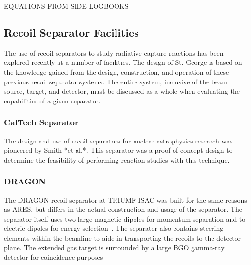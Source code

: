 EQUATIONS FROM SIDE LOGBOOKS


\subsection{Recoil Separator Facilities}

The use of recoil separators to study radiative capture reactions has been
explored recently at a number of facilities. The design of St. George is based
on the knowledge gained from the design, construction, and operation of these
previous recoil separator systems. The entire system, inclusive of the beam
source, target, and detector, must be discussed as a whole when evaluating the
capabilities of a given separator.

\subsubsection{CalTech Separator}

The design and use of recoil separators for nuclear astrophysics research was
pioneered by Smith *et al.*. This separator was a proof-of-concept design to
determine the feasibility of performing reaction studies with this technique.

\subsubsection{DRAGON}
The DRAGON recoil separator at TRIUMF-ISAC was built for the same reasons as ARES,
but differs in the actual construction and usage of the separator.
The separator
itself uses two large magnetic dipoles for momentum separation and to electric
dipoles for energy selection~\cite{Engel2005}. The separator also contains
steering elements within the beamline to aide in transporting the recoils to
the detector plane. The extended gas target is surrounded by a large BGO
gamma-ray detector for coincidence purposes

